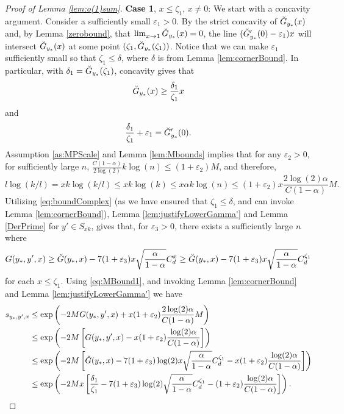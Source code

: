 \documentclass[12pt,reqno]{amsart}
\numberwithin{equation}{section}
\theoremstyle{definition}
\renewcommand{\epsilon}{\varepsilon}
\newcommand{\conv}[1]{\overset{#1}{\rightarrow}}
\renewcommand{\[}{\begin{equation}}
\renewcommand{\]}{\end{equation}}
\renewcommand{\|}{\bigg{|}}
\begin{document}
\begin{proof}[Proof of Lemma \ref{lem:o(1)sum}]
    \textbf{Case 1}, $x \leq \zeta_1$, $x \ne 0$:
    We start with a concavity argument. Consider a sufficiently small $\epsilon_1 > 0$. By the strict concavity of $\Breve{G}_{y_*}(x)$ and, by Lemma \ref{zerobound}, that $\lim_{x \conv{} 1}\Breve{G}_{y_*}(x) = 0$, the line $(\Breve{G}'_{y_*}(0) - \epsilon_1)x$ will intersect $\Breve{G}_{y_*}(x)$ at some point $(\zeta_1, \Breve{G}_{y_*}(\zeta_1))$. Notice that we can make $\epsilon_1$ sufficiently small so that $\zeta_1 \leq \delta$, where $\delta$ is from Lemma \ref{lem:cornerBound}. In particular, with $\delta_1 = \Breve{G}
    _{y_*}(\zeta_1)$, concavity gives that \[\Breve{G}_{y_*}(x) \geq \frac{\delta_1}{\zeta_1}x\] and \[\frac{\delta_1}{\zeta_1} + \epsilon_1 = \Breve{G}'_{y_*}(0).\] 
    Assumption \ref{as:MPScale} and Lemma \ref{lem:Mbounds} implies that for any $\epsilon_2 > 0$, for sufficiently large $n$, $\frac{C(1-\alpha)}{2\log(2)}k\log(n) \leq (1 + \epsilon_{2})M$, and therefore,
    \[
        l \log(k/l) = x k \log(k/l) \leq x k \log(k) \leq x\alpha k\log(n) \leq (1 + \epsilon_{2})x\frac{2\log(2)\alpha}{C(1-\alpha)}M.\label{eq:MBound1}
    \]
    Utilizing \eqref{eq:boundComplex} (as we have ensured that $\zeta_1 \leq \delta$, and can invoke Lemma \ref{lem:cornerBound}), Lemma \ref{lem:justifyLowerGamma'} and Lemma \ref{DerPrime} for $y' \in S_{xk}$, gives that, for $\epsilon_3 > 0$, there exists a sufficiently large $n$ where
    \[G(y_*, y', x) \geq \Breve{G}(y_*,x) - 7(1 + \epsilon_{3})x\sqrt{\frac{\alpha}{1-\alpha}}C_d^{x} \geq \Breve{G}(y_*,x) - 7(1 + \epsilon_{3})x\sqrt{\frac{\alpha}{1-\alpha}}C_d^{\zeta_1}\label{eq:GBound1}\]
    for each $x \leq \zeta_1$.
    Using \eqref{eq:MBound1}, and invoking Lemma \ref{lem:cornerBound} and Lemma \ref{lem:justifyLowerGamma'} we have
    \begin{align}
        s_{y_*, y', x} & \leq \exp\left({-2MG(y_*, y', x) + x(1+\epsilon_2)\frac{2\log(2)\alpha}{C(1-\alpha)}M} \right)\\
        &\leq \exp \left(-2M\left[G(y_*, y', x) - x (1+\epsilon_2)\frac{\log(2)\alpha}{C(1-\alpha)}\right]\right)\\
        &\leq \exp\left(-2M\left[\Breve{G}(y_*, x) - 7(1+\epsilon_3)\log(2)x\sqrt{\frac{\alpha}{1-\alpha}}C^{\zeta_1}_d -  x(1+\epsilon_2)\frac{\log(2)\alpha}{C(1-\alpha)}\right]\right)\label{eq:usedDerlem1}\\
        &\leq \exp\left(-2Mx\left[\frac{\delta_1}{\zeta_1}- 7(1+\epsilon_3)\log(2)\sqrt{\frac{\alpha}{1-\alpha}}C^{\zeta_1}_d - (1+\epsilon_2)\frac{\log(2)\alpha}{C(1-\alpha)}\right]\right).
    \end{align}

\end{proof}
\end{document}
